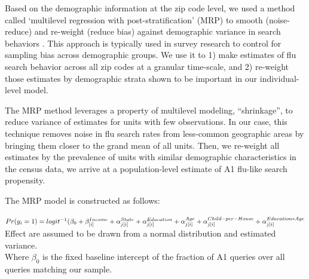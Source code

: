 \documentclass[12pt]{article}
\begin{document}
Based on the demographic information at the zip code level, we used a method called `multilevel regression with post-stratification' (MRP) to smooth (noise-reduce) and re-weight (reduce bias) against demographic variance in search behaviors \citep{gelman_and_little_1997, park_gelman_bafumi_2004}. This approach is typically used in survey research to control for sampling bias across demographic groups. We use it to 1) make estimates of flu search behavior across all zip codes at a granular time-scale, and 2) re-weight those estimates by demographic strata shown to be important in our individual-level model. 

The MRP method leverages a property of multilevel modeling, ``shrinkage'', to reduce variance of estimates for units with few observations. In our case, this technique removes noise in flu search rates from less-common geographic areas by bringing them closer to the grand mean of all units. Then, we re-weight all estimates by the prevalence of units with similar demographic characteristics in the census data, we arrive at a population-level estimate of A1 flu-like search propensity. 

The MRP model is constructed as follows:

$Pr(y_i = 1) = logit^{-1}( \beta_0  + \beta_{[i]}^{Income}
+ \alpha_{j[i]}^{State}  
+ \alpha_{j[i]}^{Education}  
+ \alpha_{j[i]}^{Age} \\
+ \alpha_{j[i]}^{Child-per-House}
+ \alpha_{j[i]}^{Education*Age} $
\\

Effect are assumed to be drawn from a normal distribution and estimated variance. \\


Where $\beta_0$ is the fixed baseline intercept of the fraction of A1 queries over all queries matching our sample. 
\end{document}
